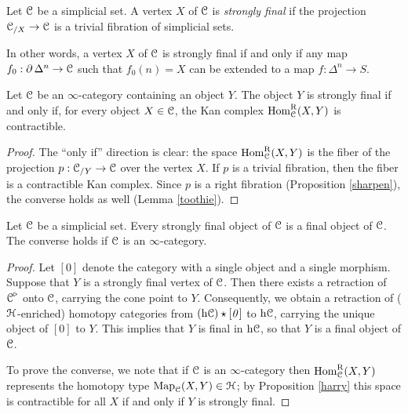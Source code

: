 \begin{1.2.12 Initial and final objects}
\begin{definition}\label{strongfin}
Let $\operatorname{\mathcal{C}}$ be a simplicial set. A
vertex $X$ of $\operatorname{\mathcal{C}}$ is {\it strongly final} if the projection $\operatorname{\mathcal{C}}_{/X}
\rightarrow \operatorname{\mathcal{C}}$ is a trivial fibration of simplicial sets. 
\end{definition}

In other words, a vertex $X$ of $\operatorname{\mathcal{C}}$ is strongly final if and only if any
map $f_0: \operatorname{\partial} \Delta^n \rightarrow \operatorname{\mathcal{C}}$ such that
$f_0(n) = X$ can be extended to a map $f: \Delta^n \rightarrow S$.

\begin{proposition}\label{harry}
Let $\operatorname{\mathcal{C}}$ be an $\infty$-category containing an object $Y$. The object
$Y$ is strongly final if and only if, for every object $X \in \operatorname{\mathcal{C}}$, the Kan
complex $\operatorname{Hom}^{\operatorname{R}}_{\operatorname{\mathcal{C}}}(X,Y)$ is contractible.
\end{proposition}

\begin{proof}
The ``only if'' direction is clear: the space
$\operatorname{Hom}^{\operatorname{R}}_{\operatorname{\mathcal{C}}}(X,Y)$ is the fiber of the projection $p: \operatorname{\mathcal{C}}_{/Y}
\rightarrow \operatorname{\mathcal{C}}$ over the vertex $X$. If $p$ is a trivial
fibration, then the fiber is a contractible Kan complex. Since $p$
is a right fibration (Proposition \ref{sharpen}), the converse holds as well (Lemma \ref{toothie}).
\end{proof}

\begin{corollary}
Let $\operatorname{\mathcal{C}}$ be a simplicial set. Every strongly final object of $\operatorname{\mathcal{C}}$ is a final object of $\operatorname{\mathcal{C}}$. The converse holds if $\operatorname{\mathcal{C}}$ is an $\infty$-category.
\end{corollary}

\begin{proof}
Let $[0]$ denote the category with a single object and a single morphism.
Suppose that $Y$ is a strongly final vertex of $\operatorname{\mathcal{C}}$. Then there exists a retraction of
$\operatorname{\mathcal{C}}^{\triangleright}$ onto $\operatorname{\mathcal{C}}$, carrying the cone point to $Y$. Consequently, we obtain a retraction of ($\operatorname{\mathcal{H}}$-enriched) homotopy categories from $(\rm{h} \it{\operatorname{\mathcal{C}}}) \star [0]$ to $\rm{h} \it{\operatorname{\mathcal{C}}}$, carrying the unique object of $[0]$ to $Y$. This implies that $Y$ is final in $\rm{h} \it{\operatorname{\mathcal{C}}}$, so that $Y$ is a final object of $\operatorname{\mathcal{C}}$.

To prove the converse, we note that if $\operatorname{\mathcal{C}}$ is an $\infty$-category then $\operatorname{Hom}_{\operatorname{\mathcal{C}}}^{\operatorname{R}}(X,Y)$ represents the homotopy type $\operatorname{{Map}}_{\operatorname{\mathcal{C}}}(X,Y) \in \operatorname{\mathcal{H}}$; by Proposition \ref{harry} this space is contractible for all $X$ if and only if $Y$ is strongly final.
\end{proof}


\end{1.2.12 Initial and final objects}
